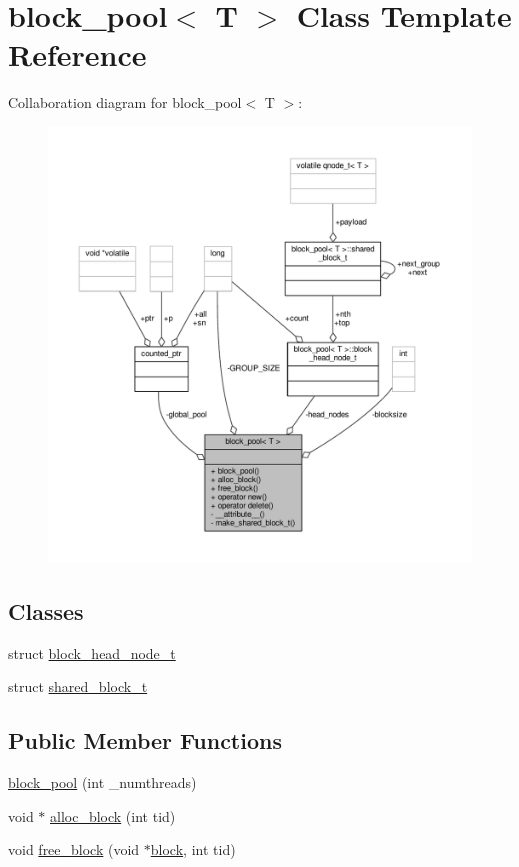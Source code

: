 \hypertarget{classblock__pool}{\section{block\-\_\-pool$<$ T $>$ Class Template Reference}
\label{classblock__pool}
}


Collaboration diagram for block\-\_\-pool$<$ T $>$\-:
\nopagebreak
\begin{figure}[H]
\begin{center}
\leavevmode
\includegraphics[width=350pt]{classblock__pool__coll__graph}
\end{center}
\end{figure}
\subsection*{Classes}
\begin{DoxyCompactItemize}
\item 
struct \hyperlink{structblock__pool_1_1block__head__node__t}{block\-\_\-head\-\_\-node\-\_\-t}
\item 
struct \hyperlink{structblock__pool_1_1shared__block__t}{shared\-\_\-block\-\_\-t}
\end{DoxyCompactItemize}
\subsection*{Public Member Functions}
\begin{DoxyCompactItemize}
\item 
\hyperlink{classblock__pool_a58c25f81f270170734166adaabda60fe}{block\-\_\-pool} (int \-\_\-numthreads)
\item 
void $\ast$ \hyperlink{classblock__pool_aca619f55ca59af84a180cecdf5dfdb95}{alloc\-\_\-block} (int tid)
\item 
void \hyperlink{classblock__pool_aaabfd73a9589b2d5d024161f3df1a11e}{free\-\_\-block} (void $\ast$\hyperlink{structblock}{block}, int tid)
\end{DoxyCompactItemize}
